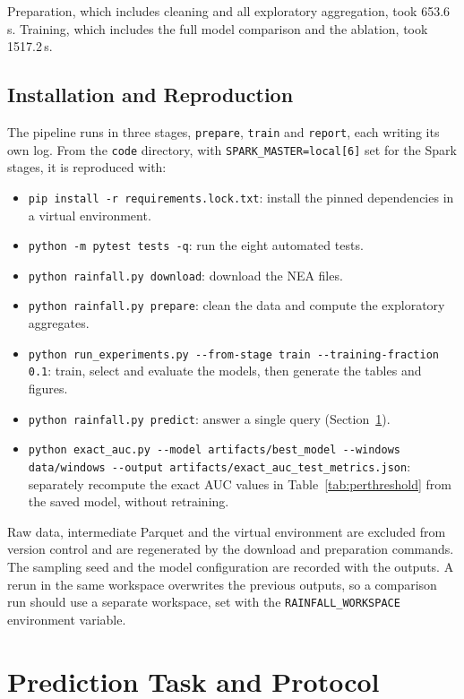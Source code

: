 \documentclass[10pt,a4paper,twocolumn,twoside]{rho-class/rho}
\begin{document}
Preparation, which includes cleaning and all exploratory aggregation, took 653.6\,s. Training, which includes the full model comparison and the ablation, took 1517.2\,s.

\subsection{Installation and Reproduction}
The pipeline runs in three stages, \texttt{prepare}, \texttt{train} and \texttt{report}, each writing its own log. From the \texttt{code} directory, with \texttt{SPARK\_MASTER=local[6]} set for the Spark stages, it is reproduced with:
{\raggedright
\begin{itemize}[topsep=0pt, itemsep=0pt]
\item \texttt{pip install -r requirements.lock.txt}: install the pinned dependencies in a virtual environment.
\item \texttt{python -m pytest tests -q}: run the eight automated tests.
\item \texttt{python rainfall.py download}: download the NEA files.
\item \texttt{python rainfall.py prepare}: clean the data and compute the exploratory aggregates.
\item \texttt{python run\_experiments.py -{}-from-stage train -{}-training-fraction 0.1}: train, select and evaluate the models, then generate the tables and figures.
\item \texttt{python rainfall.py predict}: answer a single query (Section~\ref{sec:task}).
\item \texttt{python exact\_auc.py -{}-model artifacts/best\_model -{}-windows data/windows -{}-output artifacts/exact\_auc\_test\_metrics.json}: separately recompute the exact AUC values in Table~\ref{tab:perthreshold} from the saved model, without retraining.
\end{itemize}
\par}
Raw data, intermediate Parquet and the virtual environment are excluded from version control and are regenerated by the download and preparation commands. The sampling seed and the model configuration are recorded with the outputs. A rerun in the same workspace overwrites the previous outputs, so a comparison run should use a separate workspace, set with the \texttt{RAINFALL\_WORKSPACE} environment variable.

\section{Prediction Task and Protocol}
\label{sec:task}
\end{document}
